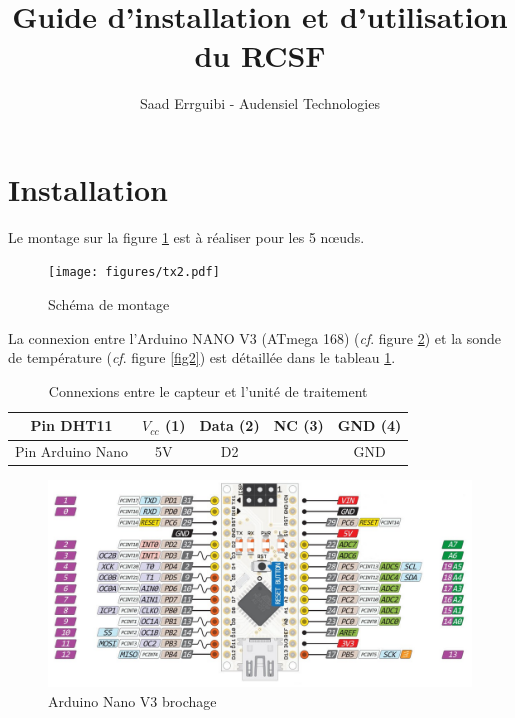\documentclass[a4paper,10pt]{article}
\title{Guide d'installation et d'utilisation du RCSF}
\author{Saad Errguibi - Audensiel Technologies}
\begin{document}
\maketitle
\section{Installation}
Le montage sur la figure \ref{tx2} est à réaliser pour les 5 n\oe uds.
\begin{figure}[!h]
	\centering
	\texttt{[image: figures/tx2.pdf]}
		\caption{Schéma de montage }
	\label{tx2}
\end{figure}
La connexion entre l'Arduino NANO V3 (ATmega 168) (\textit{cf}. figure \ref{fig1}) et la sonde de température (\textit{cf}. figure \ref{fig2}) est détaillée dans le tableau \ref{tab1}.
\begin{table}[!h]
	\centering
	\begin{tabular}{|c|c|c|c|c|}
		\hline 
		Pin DHT11 & $V_{cc}$ (1) & Data (2) & NC (3) & GND (4) \\ 
		\hline 
		Pin Arduino Nano & 5V & D2 &  & GND \\ 
		\hline 
	\end{tabular}
	\caption{Connexions entre le capteur et l'unité de traitement} \label{tab1} 	
\end{table}
\begin{figure}[h]
	\centering
	\includegraphics[scale=.5]{figures/nano.jpg}
		\caption{Arduino Nano V3 brochage}
		\label{fig1}
\end{figure}
\end{document}
